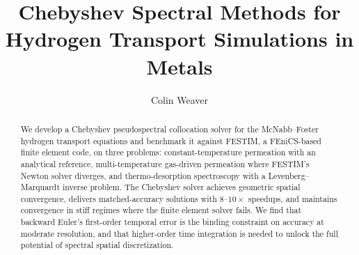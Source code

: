 \documentclass{siamart220329}
\title{Chebyshev Spectral Methods for Hydrogen Transport Simulations in Metals}
\author{Colin Weaver}
\begin{document}
\maketitle

\begin{abstract}
We develop a Chebyshev pseudospectral collocation solver for the McNabb--Foster hydrogen transport equations and benchmark it against FESTIM, a FEniCS-based finite element code, on three problems: constant-temperature permeation with an analytical reference, multi-temperature gas-driven permeation where FESTIM's Newton solver diverges, and thermo-desorption spectroscopy with a Levenberg--Marquardt inverse problem. The Chebyshev solver achieves geometric spatial convergence, delivers matched-accuracy solutions with $8$--$10\times$ speedups, and maintains convergence in stiff regimes where the finite element solver fails. We find that backward Euler's first-order temporal error is the binding constraint on accuracy at moderate resolution, and that higher-order time integration is needed to unlock the full potential of spectral spatial discretization.
\end{abstract}










\end{document}

